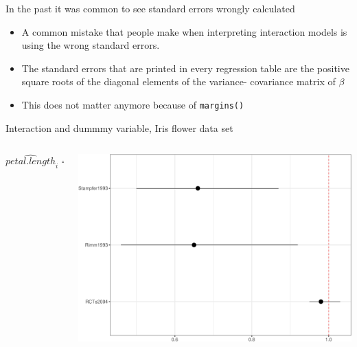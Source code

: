 \documentclass[australian,ignorenonframetext,aspectratio=169]{beamer}
\providecommand{\tightlist}{%
  \setlength{\itemsep}{0pt}\setlength{\parskip}{0pt}}
\begin{document}
\begin{frame}[fragile]{In the past it was common to see standard errors
wrongly calculated}
\protect\hypertarget{in-the-past-it-was-common-to-see-standard-errors-wrongly-calculated}{}

\begin{itemize}
\tightlist
\item
  A common mistake that people make when interpreting interaction models
  is using the wrong standard errors.
\item
  The standard errors that are printed in every regression table are the
  positive square roots of the diagonal elements of the variance-
  covariance matrix of \(\beta\)
\item
  This does not matter anymore because of \texttt{margins()}
\end{itemize}

\end{frame}

\begin{frame}{Interaction and dummmy variable, Iris flower data set}
\protect\hypertarget{interaction-and-dummmy-variable-iris-flower-data-set}{}

\begin{columns}[T]
\begin{column}{0.5\textwidth}
\[\widehat{petal.length}_i = \beta_0 + \beta_1 sepal.length_i  \]
\end{column}

\begin{column}{0.5\textwidth}
\includegraphics{../graphs/unnamed-chunk-3-1.pdf}
\end{column}
\end{columns}

\end{frame}
\end{document}
